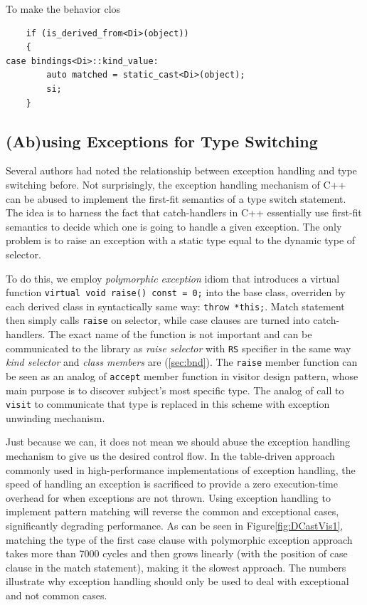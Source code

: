 \documentclass[preprint]{sigplanconf}
\makeatletter
\DeclareRobustCommand{\code}[1]{{\lstinline[breaklines=false,escapechar=@]{#1}}}
\makeatother
\begin{document}
To make the behavior clos

\begin{lstlisting}
    if (is_derived_from<Di>(object))
    {
case bindings<Di>::kind_value:
        auto matched = static_cast<Di>(object); 
        si;
    }
\end{lstlisting}


\subsection{(Ab)using Exceptions for Type Switching}
\label{sec:xpm}

Several authors had noted the relationship between exception handling and type 
switching before\cite{Glew99,ML2000}. Not surprisingly, the exception handling 
mechanism of C++ can be abused to implement the first-fit semantics of a type 
switch statement. The idea is to harness the fact that catch-handlers in C++ 
essentially use first-fit semantics to decide which one is going to handle a 
given exception. The only problem is to raise an exception with a static type 
equal to the dynamic type of selector.

To do this, we employ \emph{polymorphic exception} idiom\cite{PolyExcept} that 
introduces a virtual function \code{virtual void raise() const = 0;} into the 
base class, overriden by each derived class in syntactically same way: 
\code{throw *this;}. Match statement then simply calls \code{raise} on selector, 
while case clauses are turned into catch-handlers.
The exact name of the function is not important and can be communicated to the 
library as \emph{raise selector} with \code{RS} specifier in the same way 
\emph{kind selector} and \emph{class members} are (\textsection\ref{sec:bnd}). 
The \code{raise} member function can be seen as an analog of \code{accept} 
member function in visitor design pattern, whose main purpose is to discover 
subject's most specific type. The analog of call to \code{visit} to communicate 
that type is replaced in this scheme with exception unwinding mechanism.

Just because we can, it does not mean we should abuse the exception handling 
mechanism to give us the desired control flow. In the table-driven approach 
commonly used in high-performance implementations of exception handling, the 
speed of handling an exception is sacrificed to provide a zero execution-time 
overhead for when exceptions are not thrown\cite{Schilling98}. Using exception 
handling to implement pattern matching will reverse the common and exceptional 
cases, significantly degrading performance. As can be seen in 
Figure\ref{fig:DCastVis1}, matching the type of the first case clause with 
polymorphic exception approach takes more than 7000 cycles and then grows 
linearly (with the position of case clause in the match statement), making it the 
slowest approach. The numbers illustrate why exception handling should only be 
used to deal with exceptional and not common cases.
\end{document}
